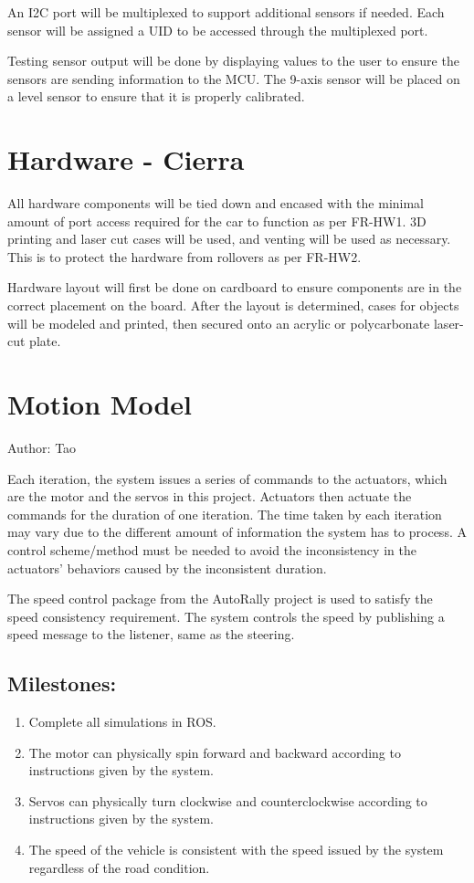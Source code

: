 \documentclass[compsoc,draftclsnofoot,onecolumn,10pt]{IEEEtran}
\begin{document}
An I2C port will be multiplexed to support additional sensors if needed. 
Each sensor will be assigned a UID to be accessed through the multiplexed port. \par

Testing sensor output will be done by displaying values to the user to ensure the sensors are sending information to the MCU. The 9-axis sensor will be placed on a level sensor to ensure that it is properly calibrated. \par

\section{Hardware - Cierra}
All hardware components will be tied down and encased with the minimal amount of port access required for the car to function as per FR-HW1. 3D printing and laser cut cases will be used, and venting will be used as necessary. This is to protect the hardware from rollovers as per FR-HW2. \par
Hardware layout will first be done on cardboard to ensure components are in the correct placement on the board. 
After the layout is determined, cases for objects will be modeled and printed, then secured onto an acrylic or polycarbonate laser-cut plate. \par

\section{Motion Model}
Author: Tao \par
Each iteration, the system issues a series of commands to the actuators, which are the motor and the servos in this project. Actuators then actuate the commands for the duration of one iteration. The time taken by each iteration may vary due to the different amount of information the system has to process. A control scheme/method must be needed to avoid the inconsistency in the actuators’ behaviors caused by the inconsistent duration.\par
The speed control package from the AutoRally project is used to satisfy the speed consistency requirement. The system controls the speed by publishing a speed message to the listener, same as the steering.\par
\subsection{Milestones:}
\begin{enumerate}
	\item Complete all simulations in ROS.
	\item The motor can physically spin forward and backward according to instructions given by the system.
	\item Servos can physically turn clockwise and counterclockwise according to instructions given by the system.
	\item The speed of the vehicle is consistent with the speed issued by the system regardless of the road condition.
\end{enumerate} 
\end{document}
